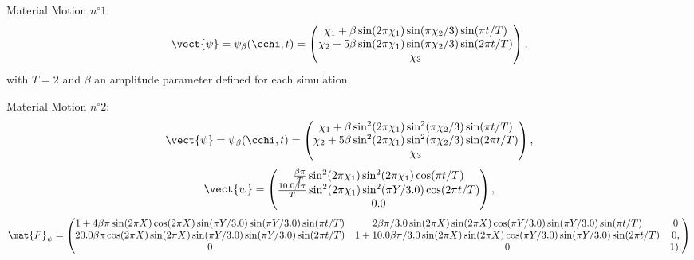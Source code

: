 Material Motion $n^\circ 1$:
\begin{equation}
	\vect{\psi} = \psi_\beta(\cchi,t) = 
	\begin{pmatrix}
		\chi_1 + \beta \sin(2\pi\chi_1) \sin(\pi\chi_2/3)\sin(\pi t/T) \\
		
		\chi_2 + 5\beta \sin(2\pi\chi_1) \sin(\pi\chi_2/3)\sin(2\pi t/T) \\
		
		\chi_3
	\end{pmatrix},
\end{equation}
with $T=2$ and $\beta$ an amplitude parameter defined for each simulation.

Material Motion $n^\circ 2$:
\begin{equation}
	\vect{\psi} = \psi_\beta(\cchi,t) = 
	\begin{pmatrix}
		\chi_1 + \beta \sin^2(2\pi\chi_1) \sin^2(\pi\chi_2/3)\sin(\pi t/T) \\
		
		\chi_2 + 5\beta \sin^2(2\pi\chi_1) \sin^2(\pi\chi_2/3)\sin(2\pi t/T) \\
		
		\chi_3
	\end{pmatrix},
\end{equation}
\begin{equation}
      \vect{w} = 
      \begin{pmatrix}
          \frac{\beta\pi}{T}  \sin^2(2\pi \chi_1)  \sin^2(2\pi \chi_1)   \cos(\pi t/T) \\
           \frac{10.0\beta\pi}{T}  \sin^2(2\pi \chi_1)  \sin^2(\pi Y/3.0)  \cos(2\pi t/T) \\
           0.0
\end{pmatrix},
\end{equation}
\begin{equation}
\mat{F}_{\psi} = 
\begin{pmatrix}
1 + 4\beta\pi  \sin(2\pi X)  \cos(2\pi X)  \sin(\pi Y/3.0)   \sin(\pi Y/3.0)   \sin(\pi t/T ) &
2 \beta  \pi/3.0   \sin(2 \pi X)   \sin(2 \pi X)   \cos(\pi Y/3.0)   \sin(\pi Y/3.0)   \sin(\pi t/T ) &
0 \\
20.0 \beta  \pi  \cos(2 \pi X)   \sin(2 \pi X)   \sin(\pi Y/3.0)   \sin(\pi Y/3.0)   \sin(2 \pi t/T ) &
1 + 10.0 \beta  \pi/3.0   \sin(2 \pi X)   \sin(2 \pi X)   \cos(\pi Y/3.0)   \sin(\pi Y/3.0)   \sin(2 \pi t/T ) &
0,\\
0 &
0 &
1
);
\end{pmatrix}
\end{equation}

